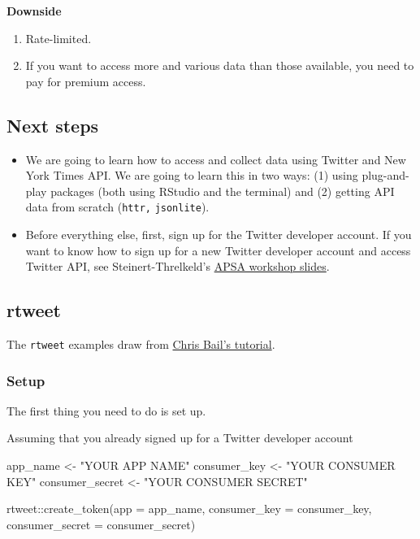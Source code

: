 \documentclass[
]{book}
\newenvironment{Shaded}{\begin{snugshade}}{\end{snugshade}}
\newcommand{\AttributeTok}[1]{\textcolor[rgb]{0.77,0.63,0.00}{#1}}
\newcommand{\FunctionTok}[1]{\textcolor[rgb]{0.00,0.00,0.00}{#1}}
\newcommand{\NormalTok}[1]{#1}
\newcommand{\OtherTok}[1]{\textcolor[rgb]{0.56,0.35,0.01}{#1}}
\newcommand{\SpecialCharTok}[1]{\textcolor[rgb]{0.00,0.00,0.00}{#1}}
\newcommand{\StringTok}[1]{\textcolor[rgb]{0.31,0.60,0.02}{#1}}
\begin{document}
\textbf{Downside}

\begin{enumerate}
\def\labelenumi{\arabic{enumi}.}
\item
  Rate-limited.
\item
  If you want to access more and various data than those available, you need to pay for premium access.
\end{enumerate}

\hypertarget{next-steps}{%
\subsection{Next steps}\label{next-steps}}

\begin{itemize}
\item
  We are going to learn how to access and collect data using Twitter and New York Times API. We are going to learn this in two ways: (1) using plug-and-play packages (both using RStudio and the terminal) and (2) getting API data from scratch (\texttt{httr,} \texttt{jsonlite}).
\item
  Before everything else, first, sign up for the Twitter developer account. If you want to know how to sign up for a new Twitter developer account and access Twitter API, see Steinert-Threlkeld's \href{https://github.com/ZacharyST/APSA2020_EventDataFromSocialMedia/blob/master/Presentation/02_AccessTwitter.pdf}{APSA workshop slides}.
\end{itemize}

\hypertarget{rtweet}{%
\subsection{rtweet}\label{rtweet}}

The \texttt{rtweet} examples draw from \href{https://cbail.github.io/SICSS_APIs_markdown.html}{Chris Bail's tutorial}.

\hypertarget{setup-5}{%
\subsubsection{Setup}\label{setup-5}}

The first thing you need to do is set up.

Assuming that you already signed up for a Twitter developer account

\begin{Shaded}
\begin{Highlighting}[]
\NormalTok{app\_name }\OtherTok{\textless{}{-}} \StringTok{"YOUR APP NAME"}
\NormalTok{consumer\_key }\OtherTok{\textless{}{-}} \StringTok{"YOUR CONSUMER KEY"}
\NormalTok{consumer\_secret }\OtherTok{\textless{}{-}} \StringTok{"YOUR CONSUMER SECRET"}

\NormalTok{rtweet}\SpecialCharTok{::}\FunctionTok{create\_token}\NormalTok{(}\AttributeTok{app =}\NormalTok{ app\_name, }
                     \AttributeTok{consumer\_key =}\NormalTok{ consumer\_key, }
                     \AttributeTok{consumer\_secret =}\NormalTok{ consumer\_secret)}
\end{Highlighting}
\end{Shaded}
\end{document}
